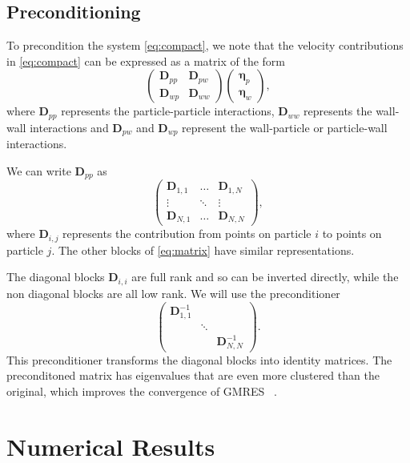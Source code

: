 \subsection{Preconditioning}

To precondition the system \eqref{eq:compact}, we note that the velocity contributions in \eqref{eq:compact} can be expressed as a matrix of the form
\begin{equation}\label{eq:matrix}\begin{pmatrix} \mathbf{D}_{pp} & \mathbf{D}_{pw}\\ \mathbf{D}_{wp} & \mathbf{D}_{ww}\end{pmatrix}\begin{pmatrix}\pmb{\eta}_p \\ \pmb{\eta}_w\end{pmatrix}, 
\end{equation}
where $\mathbf{D}_{pp}$ represents the particle-particle interactions, $\mathbf{D}_{ww}$ represents the wall-wall interactions and $\mathbf{D}_{pw}$ and $\mathbf{D}_{wp}$ represent the wall-particle or particle-wall interactions. 

We can write $\mathbf{D}_{pp}$ as
\begin{equation}\label{eq:d_matrix} \begin{pmatrix} \mathbf{D}_{1,1} & \hdots &\mathbf{D}_{1,N} \\ \vdots & \ddots & \vdots \\ \mathbf{D}_{N,1} & \hdots & \mathbf{D}_{N,N}\end{pmatrix},\end{equation}
where $\mathbf{D}_{i,j}$ represents the contribution from points on particle $i$ to points on particle $j$. The other blocks of \eqref{eq:matrix} have similar representations.

The diagonal blocks $\mathbf{D}_{i,i}$ are full rank and so can be inverted directly, while the non diagonal blocks are all low rank. We will use the preconditioner
\[ \begin{pmatrix} \mathbf{D}_{1,1}^{-1} &  & \\ & \ddots \\ & & \mathbf{D}^{-1}_{N,N}\end{pmatrix}.\]
This preconditioner transforms the diagonal blocks into identity matrices. The preconditoned matrix has eigenvalues that are even more clustered than the original, which improves the convergence of GMRES ~\cite{Rasmussen2001}.

\section{Numerical Results}

